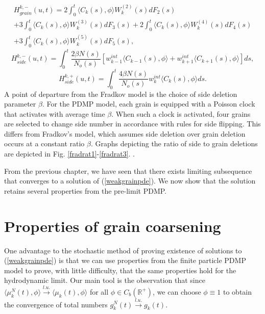 \begin{eqnarray}
H_{grain}^{k,-}(u,t) =2 \int_0^t\langle C_{k}(s), \phi \rangle W^{(2)}_{k}(s)dF_2(s)\\+3\int_0^t\langle C_{k}(s), \phi \rangle W^{(3)}_{k}(s)dF_3(s)+2\int_0^t\langle C_{k}(s), \phi \rangle W^{(4)}_{k}(s)dF_4(s)\nonumber\\+3\int_0^t\langle C_{k}(s), \phi \rangle W^{(5)}_{k}(s)dF_{5}(s), \nonumber
\end{eqnarray}
\begin{equation}
H_{side}^{k,-}(u,t)= \int_0^t\frac{2\beta N(s)}{N_o(s)}[w_{k-1}^{int}\langle C_{k-1}(s), \phi \rangle+w_{k+1}^{int}\langle C_{k+1}(s), \phi \rangle]ds,
\end{equation}
\begin{equation}
H_{side}^{k,+}(u,t)= \int_0^t\frac{4\beta N(s)}{N_o(s)}w_{k}^{int}\langle C_{k}(s), \phi \rangle ds.
\end{equation}
A point of departure from the Fradkov model is the choice of side deletion parameter $\beta$.  For the PDMP model, each grain is equipped with a Poisson clock that activates with average time $\beta$.  When such a clock is activated, four grains are selected to change side number in accordance with rules for side flipping.  This differs from Fradkov's model, which assumes side deletion over grain deletion occurs at a constant ratio $\beta$.  Graphs depicting the ratio of side to grain deletions are depicted in Fig. \ref{fradrat1}-\ref{fradrat3}. .  
       


From the previous chapter, we have seen that there exists limiting subsequence that converges to a solution of (\ref{weakgrainpde}).  We now show that the solution retains several properties from the pre-limit PDMP.

\section{Properties of grain coarsening}

One advantage to the stochastic method of proving existence  of solutions to (\ref{weakgrainpde}) is that we can use properties from the finite particle PDMP model to prove, with little difficulty, that the same properties hold for the hydrodynamic limit.  Our main tool is the observation that since $\langle \mu_k^N(t),\phi\rangle \xrightarrow {l.u.} \langle \mu_k(t),\phi\rangle$ for all $\phi \in C_b(\mathbb{R}^+)$, we can choose $\phi \equiv 1$ to obtain the convergence of total numbers $g^N_k(t)\xrightarrow{l.u.} g_k(t)$.

